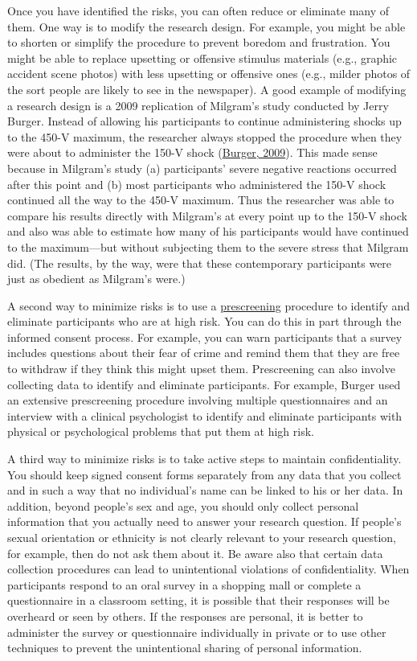 \documentclass[
]{krantz}
\begin{document}
Once you have identified the risks, you can often reduce or eliminate many of them. One way is to modify the research design. For example, you might be able to shorten or simplify the procedure to prevent boredom and frustration. You might be able to replace upsetting or offensive stimulus materials (e.g., graphic accident scene photos) with less upsetting or offensive ones (e.g., milder photos of the sort people are likely to see in the newspaper). A good example of modifying a research design is a 2009 replication of Milgram's study conducted by Jerry Burger. Instead of allowing his participants to continue administering shocks up to the 450-V maximum, the researcher always stopped the procedure when they were about to administer the 150-V shock (\protect\hyperlink{ref-burger2009replicating}{Burger, 2009}). This made sense because in Milgram's study (a) participants' severe negative reactions occurred after this point and (b) most participants who administered the 150-V shock continued all the way to the 450-V maximum. Thus the researcher was able to compare his results directly with Milgram's at every point up to the 150-V shock and also was able to estimate how many of his participants would have continued to the maximum---but without subjecting them to the severe stress that Milgram did. (The results, by the way, were that these contemporary participants were just as obedient as Milgram's were.)

A second way to minimize risks is to use a \protect\hyperlink{prescreening}{prescreening} procedure to identify and eliminate participants who are at high risk. You can do this in part through the informed consent process. For example, you can warn participants that a survey includes questions about their fear of crime and remind them that they are free to withdraw if they think this might upset them. Prescreening can also involve collecting data to identify and eliminate participants. For example, Burger used an extensive prescreening procedure involving multiple questionnaires and an interview with a clinical psychologist to identify and eliminate participants with physical or psychological problems that put them at high risk.

A third way to minimize risks is to take active steps to maintain confidentiality. You should keep signed consent forms separately from any data that you collect and in such a way that no individual's name can be linked to his or her data. In addition, beyond people's sex and age, you should only collect personal information that you actually need to answer your research question. If people's sexual orientation or ethnicity is not clearly relevant to your research question, for example, then do not ask them about it. Be aware also that certain data collection procedures can lead to unintentional violations of confidentiality. When participants respond to an oral survey in a shopping mall or complete a questionnaire in a classroom setting, it is possible that their responses will be overheard or seen by others. If the responses are personal, it is better to administer the survey or questionnaire individually in private or to use other techniques to prevent the unintentional sharing of personal information.
\end{document}
